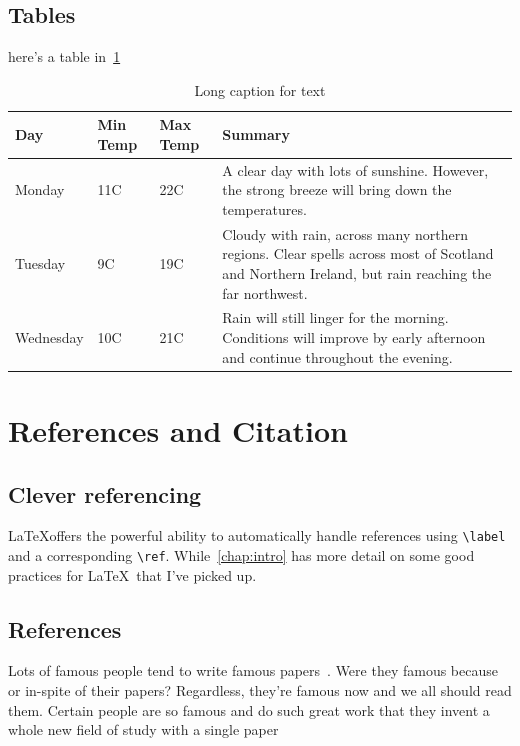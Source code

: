 \subsection{Tables}\label{ssec:tables}

here's a table in~\cref{tab:table}

\begin{table}
\begin{center}
    \begin{tabular}{ | l | l | l | p{5cm} |}
    \hline
    Day & Min Temp & Max Temp & Summary \\ \hline
    Monday & 11C & 22C & A clear day with lots of sunshine.  
    However, the strong breeze will bring down the temperatures. \\ \hline
    Tuesday & 9C & 19C & Cloudy with rain, across many northern regions. Clear spells 
    across most of Scotland and Northern Ireland, 
    but rain reaching the far northwest. \\ \hline
    Wednesday & 10C & 21C & Rain will still linger for the morning. 
    Conditions will improve by early afternoon and continue 
    throughout the evening. \\
    \hline
    \end{tabular}
    \caption[Short caption for table]{Long caption for text \label{tab:table}}
    \end{center}
\end{table}

\section{References and Citation}

\subsection{Clever referencing}
\LaTeX offers the powerful ability to automatically handle references using \verb+\label+ and a corresponding \verb+\ref+.
While~\cref{chap:intro} has more detail on some good practices for \LaTeX~that I've picked up.

\subsection{References}

Lots of famous people tend to write famous papers~\cite{newton1999}. 
Were they famous because or in-spite of their papers?
Regardless, they're famous now and we all should read them.
Certain people are so famous and do such great work that they invent a whole new field of study with a single paper~\cite{kalman1960,shannon1949}

